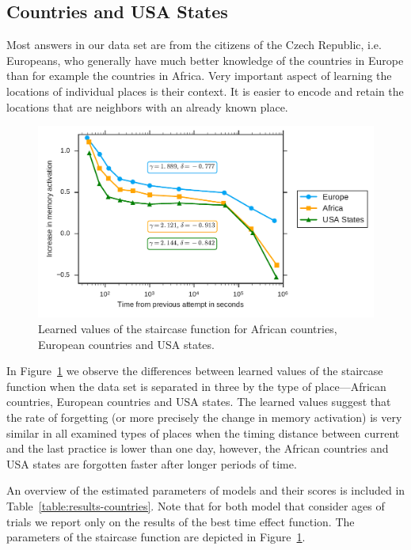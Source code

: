 \subsection{Countries and USA States}

Most answers in our data set are from the citizens of the Czech Republic, i.e. Europeans, who generally have much better knowledge of the countries in Europe than for example the countries in Africa. Very important aspect of learning the locations of individual places is their context. It is easier to encode and retain the locations that are neighbors with an already known place.

\begin{figure}[htbp]
  \centering
  \includegraphics[width=\textwidth]{img/africa-europe-usa-states}
  \caption{Learned values of the staircase function for African countries, European countries and USA states.}
  \label{fig:africa-europe-usa-states}
\end{figure}

In Figure~\ref{fig:africa-europe-usa-states} we observe the differences between learned values of the staircase function when the data set is separated in three by the type of place---African countries, European countries and USA states. The learned values suggest that the rate of forgetting (or more precisely the change in memory activation) is very similar in all examined types of places when the timing distance between current and the last practice is lower than one day, however, the African countries and USA states are forgotten faster after longer periods of time.

An overview of the estimated parameters of models and their scores is included in Table~\ref{table:results-countries}. Note that for both model that consider ages of trials we report only on the results of the best time effect function. The parameters of the staircase function are depicted in Figure~\ref{fig:africa-europe-usa-states}.

